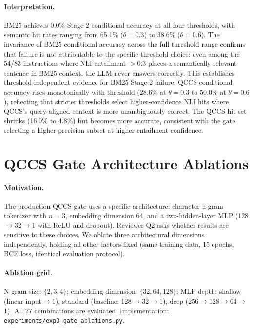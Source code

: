 \documentclass{article}
\begin{document}
\paragraph{Interpretation.}
BM25 achieves 0.0\% Stage-2 conditional accuracy at all four thresholds, with
semantic hit rates ranging from 65.1\% ($\theta{=}0.3$) to 38.6\% ($\theta{=}0.6$).
The invariance of BM25 conditional accuracy across the full threshold range confirms
that failure is not attributable to the specific threshold choice: even among the
54/83 instructions where NLI entailment $> 0.3$ places a semantically relevant
sentence in BM25 context, the LLM never answers correctly. This establishes
threshold-independent evidence for BM25 Stage-2 failure.
QCCS conditional accuracy rises monotonically with threshold (28.6\% at $\theta{=}0.3$
to 50.0\% at $\theta{=}0.6$), reflecting that stricter thresholds select
higher-confidence NLI hits where QCCS's query-aligned context is more
unambiguously correct. The QCCS hit set shrinks (16.9\% to 4.8\%) but becomes
more accurate, consistent with the gate selecting a higher-precision subset
at higher entailment confidence.



\section{QCCS Gate Architecture Ablations}
\label{app:gate_ablations}

\paragraph{Motivation.}
The production QCCS gate uses a specific architecture: character n-gram tokenizer
with $n{=}3$, embedding dimension 64, and a two-hidden-layer MLP
(128$\to$32$\to$1 with ReLU and dropout). Reviewer Q2 asks whether results are
sensitive to these choices. We ablate three architectural dimensions independently,
holding all other factors fixed (same training data, 15 epochs, BCE loss,
identical evaluation protocol).

\paragraph{Ablation grid.}
N-gram size: $\{2, 3, 4\}$; embedding dimension: $\{32, 64, 128\}$;
MLP depth: shallow (linear input$\to$1), standard (baseline: 128$\to$32$\to$1),
deep (256$\to$128$\to$64$\to$1). All 27 combinations are evaluated.
Implementation: \texttt{experiments/exp3\_gate\_ablations.py}.
\end{document}
